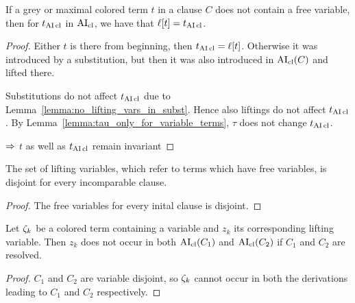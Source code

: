 \documentclass[,%
	paper=a4,%
	DIV12, %
	twoside=false,%
	liststotoc,
	bibtotoc,
	draft=false,%
	numbers=noendperiod
]{scrartcl}
\begin{document}
\begin{lemma}
	\label{lemma:jka5a5halat}
	If a grey or maximal colored term $t$ in a clause $C$ does not contain a free variable, then for $t_{\operatorname{AI}\mathrm{cl}}$ in $\operatorname{AI}_\mathrm{cl}$, we have that $\ell[t]=t_{\operatorname{AI}\mathrm{cl}}$. 
\end{lemma}
\begin{proof}
	Either $t$ is there from beginning, then $t_{\operatorname{AI}\mathrm{cl}} = \ell[t]$.
	Otherwise it was introduced by a substitution, but then it was also introduced in $\operatorname{AI}_\mathrm{cl}(C)$ and lifted there.

	Substitutions do not affect $t_{\operatorname{AI}\mathrm{cl}}$ due to Lemma~\ref{lemma:no_lifting_vars_in_subst}.
	Hence also liftings do not affect $t_{\operatorname{AI}\mathrm{cl}}$.
	By Lemma~\ref{lemma:tau_only_for_variable_terms}, $\tau$ does not change $t_{\operatorname{AI}\mathrm{cl}}$.

	$\Rightarrow$ $t$ as well as $t_{\operatorname{AI}\mathrm{cl}}$ remain invariant
\end{proof}

\begin{lemma}
	\label{lemma:disjoint_lifting_variables}
	The set of lifting variables, which refer to terms which have free variables, is disjoint for every incomparable clause.
\end{lemma}
\begin{proof}
	The free variables for every inital clause is disjoint.
\end{proof}


\begin{lemma}
	\label{lemma:lifting_variables_disjoint}
	Let $\zeta_{k}$ be a colored term containing a variable and $z_k$ its corresponding lifting variable.
	Then $z_k$ does not occur in both $\operatorname{AI}_\mathrm{cl}(C_1)$ and $\operatorname{AI}_\mathrm{cl}(C_2)$ if $C_1$ and $C_2$ are resolved.
\end{lemma}
\begin{proof}
	$C_1$ and $C_2$ are variable disjoint, so $\zeta_{k}$ cannot occur in both the derivations leading to $C_1$ and $C_2$ respectively. 
\end{proof}
\end{document}
